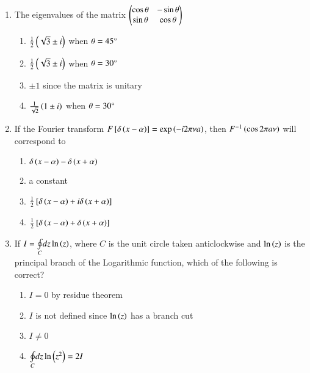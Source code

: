 \documentclass[journal]{IEEEtran}
\begin{document}
\begin{enumerate}
    \item The eigenvalues of the matrix $\begin{pmatrix}\cos\theta & -\sin\theta \\ \sin\theta & \cos\theta\end{pmatrix}$
		\begin{multicols}{2}
			\begin{enumerate}
				\item $\frac{1}{2}\left(\sqrt{3}\pm i\right)$ when $\theta=45\degree$
				\item $\frac{1}{2}\left(\sqrt{3}\pm i\right)$ when $\theta=30\degree$
				\item $\pm1$ since the matrix is unitary
				\item $\frac{1}{\sqrt{2}}\left(1\pm i\right)$ when $\theta=30\degree$
			\end{enumerate}
		\end{multicols}

    \item If the Fourier transform $F\left[\delta\left(x-\alpha\right)\right]=\exp\left(-i2\pi\nu a\right)$, then $F^{-1}\left(\cos 2\pi a\nu\right)$ will correspond to 

    \begin{multicols}{2}
       \begin{enumerate}
            \item $\delta\left(x-\alpha\right)-\delta\left(x+\alpha\right)$
            \item a constant
            \item $\frac{1}{2}\left[\delta\left(x-\alpha\right)+i\delta\left(x+\alpha\right)\right]$
            \item $\frac{1}{2}\left[\delta\left(x-\alpha\right)+\delta\left(x+\alpha\right)\right]$
        \end{enumerate}
    \end{multicols}
  
    \item If $I=\underset{C}{\oint}dz\ln\left(z\right)$, where $C$ is the unit circle taken anticlockwise and $\ln\left(z\right)$ is the principal branch of the Logarithmic function, which of the following is correct?

    \begin{multicols}{2}
        \begin{enumerate}
            \item $I=0$ by residue theorem
            \item $I$ is not defined since $\ln\left(z\right)$ has a branch cut
            \item $I\neq0$
            \item $\underset{C}{\oint}dz\ln\left(z^2\right)=2I$
        \end{enumerate}
    \end{multicols}


\end{enumerate}
\end{document}
